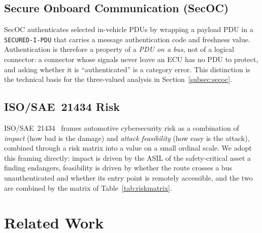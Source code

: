 \documentclass[journal]{IEEEtran}
\begin{document}
\subsection{Secure Onboard Communication (SecOC)}
SecOC authenticates selected in-vehicle PDUs by wrapping a payload PDU in a
\texttt{SECURED-I-PDU} that carries a message authentication code and freshness
value. Authentication is therefore a property of a \emph{PDU on a bus}, not of a
logical connector: a connector whose signals never leave an ECU has no PDU to
protect, and asking whether it is ``authenticated'' is a category error. This
distinction is the technical basis for the three-valued analysis in
Section~\ref{subsec:secoc}.

\subsection{ISO/SAE~21434 Risk}
ISO/SAE~21434~\cite{iso21434} frames automotive cybersecurity risk as a
combination of \emph{impact} (how bad is the damage) and \emph{attack
feasibility} (how easy is the attack), combined through a risk matrix into a
value on a small ordinal scale. We adopt this framing directly: impact is driven
by the ASIL of the safety-critical asset a finding endangers, feasibility is
driven by whether the route crosses a bus unauthenticated and whether its entry
point is remotely accessible, and the two are combined by the matrix of
Table~\ref{tab:riskmatrix}.

\section{Related Work}
\label{sec:related}
\end{document}

